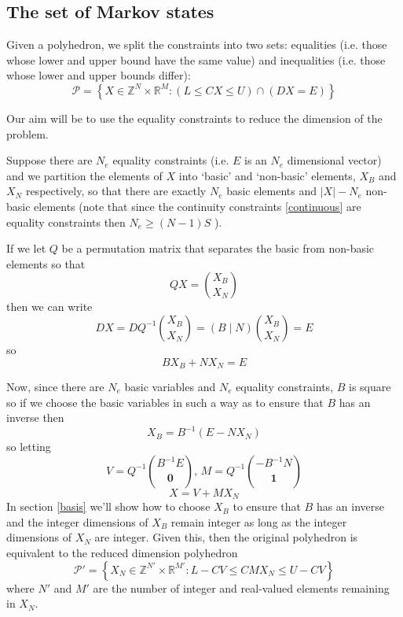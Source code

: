 \documentclass{article}
\begin{document}
\subsection{The set of Markov states}

Given a polyhedron, we split the constraints into two sets: equalities (i.e. those whose lower and upper bound have the same value) and inequalities (i.e. those whose lower and upper bounds differ):
\begin{equation}
\mathcal{P} = \left\{X \in \mathbb{Z}^N \times \mathbb{R}^M: \left(L \le CX \le U\right) \cap \left(DX = E\right) \right\}
\label{zPolySupport}
\end{equation}

Our aim will be to use the equality constraints to reduce the dimension of the problem.

Suppose there are $N_e$ equality constraints (i.e. $E$ is an $N_e$ dimensional vector) and we partition the elements of $X$ into `basic' and `non-basic' elements, $X_B$ and $X_N$ respectively, so that there are exactly $N_e$ basic elements and $|X| - N_e$ non-basic elements (note that since the continuity constraints \eqref{continuous} are equality constraints then $N_e \ge (N-1)S$ ).

If we let $Q$ be a permutation matrix that separates the basic from non-basic elements so that
\[
QX = {X_B \choose X_N}
\]
then we can write
\[
DX = DQ^{-1}{X_B \choose X_N} = \left(B \mid N\right){X_B \choose X_N} = E
\]
so
\begin{equation}
BX_B + NX_N = E
\label{eqconstraints}
\end{equation}

Now, since there are $N_e$ basic variables and $N_e$ equality constraints, $B$ is square so if we choose the basic variables in such a way as to ensure that $B$ has an inverse then
\begin{equation}
X_B = B^{-1}(E - NX_N)
\label{basicvars}
\end{equation}
so letting
\[
V = Q^{-1}{B^{-1}E \choose \mathbf{0}}, \, M = Q^{-1}{-B^{-1}N \choose \mathbf{1}}
\]
\begin{equation}
X = V + MX_N
\label{markovtotrajectory}
\end{equation}
In section \ref{basis} we'll show how to choose $X_B$ to ensure that $B$ has an inverse and the integer dimensions of $X_B$ remain integer as long as the integer dimensions of $X_N$ are integer. Given this, then the original polyhedron is equivalent to the reduced dimension polyhedron
\begin{equation}
\mathcal{P}' = \left\{X_N \in \mathbb{Z}^{N'} \times \mathbb{R}^{M'}: L-CV \le  CMX_N \le U-CV\right\}
\label{reducedPolySupport}
\end{equation}
where $N'$ and $M'$ are the number of integer and real-valued elements remaining in $X_N$.
\end{document}
